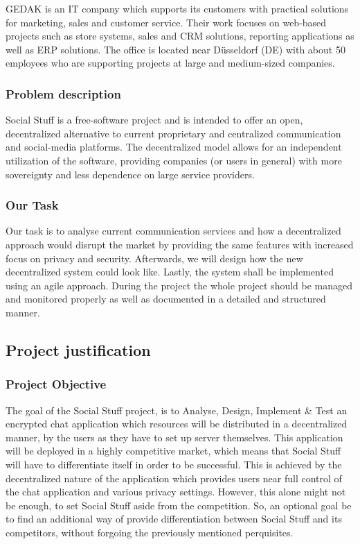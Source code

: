 GEDAK is an IT company which supports its customers with practical solutions for marketing, sales and customer service.
Their work focuses on web-based projects such as store systems, sales and CRM solutions, reporting applications as well
as ERP solutions.
The office is located near Düsseldorf (DE) with about 50 employees who are supporting projects at large and medium-sized
companies.

\subsubsection{Problem description}

Social Stuff is a free-software project and is intended to offer an open, decentralized alternative to current
proprietary and centralized communication and social-media platforms.
The decentralized model allows for an independent utilization of the software, providing companies (or users in general)
with more sovereignty and less dependence on large service providers.

\subsubsection{Our Task}

Our task is to analyse current communication services and how a decentralized approach would disrupt the market by
providing the same features with increased focus on privacy and security.
Afterwards, we will design how the new decentralized system could look like.
Lastly, the system shall be implemented using an agile approach.
During the project the whole project should be managed and monitored properly as well as documented in a detailed and
structured manner.

\subsection{Project justification}\label{subsec:project-justification}

\subsubsection{Project Objective}

The goal of the Social Stuff project, is to Analyse, Design, Implement \& Test an encrypted chat application which
resources will be distributed in a decentralized manner, by the users as they have to set up server themselves.
This application will be deployed in a highly competitive market, which means that Social Stuff will have to
differentiate itself in order to be successful.
This is achieved by the decentralized nature of the application which provides users near full control of the
chat application and various privacy settings.
However, this alone might not be enough, to set Social Stuff aside from the competition.
So, an optional goal be to find an additional way of provide differentiation between Social Stuff and its competitors,
without forgoing the previously mentioned perquisites.

